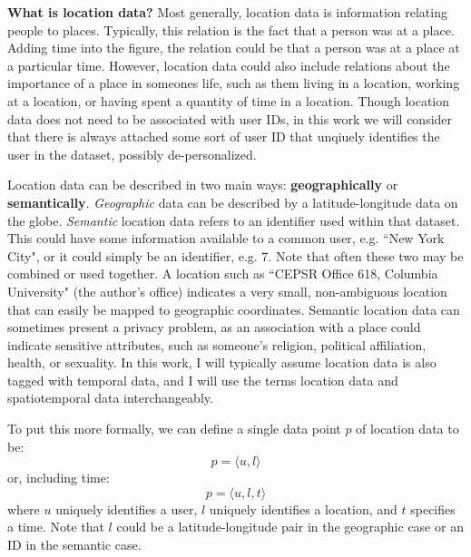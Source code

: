 \textbf{What is location data?}
Most generally, location data is information relating people to places.
Typically, this relation is the fact that a person was at a place.
Adding time into the figure, the relation could be that a person was at a place at a particular time.
However, location data could also include relations about the importance of a place in someones life, such as them living in a location, working at a location, or having spent a quantity of time in a location.
Though location data does not need to be associated with user IDs, in this work we will consider that there is always attached some sort of user ID that unqiuely identifies the user in the dataset, possibly de-personalized.

Location data can be described in two main ways: \textbf{geographically} or \textbf{semantically}.
\emph{Geographic} data can be described by a latitude-longitude data on the globe.
\emph{Semantic} location data refers to an identifier used within that dataset.
This could have some information available to a common user, e.g. ``New York City", or it could simply be an identifier, e.g. 7.
Note that often these two may be combined or used together.
A location such as ``CEPSR Office 618, Columbia University" (the author's office) indicates a very small, non-ambiguous location that can easily be mapped to geographic coordinates.
Semantic location data can sometimes present a privacy problem, as an association with a place could indicate sensitive attributes, such as someone's religion, political affiliation, health, or sexuality.
In this work, I will typically assume location data is also tagged with temporal data, and I will use the terms location data and spatiotemporal data interchangeably.

To put this more formally, we can define a single data point $p$ of location data to be:
\[ p = \langle u, l \rangle \]
or, including time:
\[ p = \langle u, l, t \rangle \]
where $u$ uniquely identifies a user, $l$ uniquely identifies a location, and $t$ specifies a time.
Note that $l$ could be a latitude-longitude pair in the geographic case or an ID in the semantic case.

